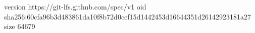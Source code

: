 version https://git-lfs.github.com/spec/v1
oid sha256:60cfa96b3d483861da10f8b72d0ccf15d1442453d16644351d26142923181a27
size 64679
